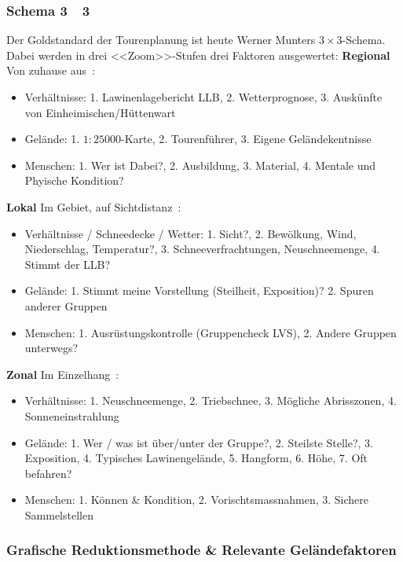 \subsubsection{Schema 3~\texttimes~3}
Der Goldstandard der Tourenplanung ist heute Werner Munters $3\times3$-Schema. Dabei werden in drei <<Zoom>>-Stufen drei Faktoren ausgewertet:
\textbf{Regional} 
Von zuhause aus~\cite{munter}:
\begin{itemize}
  \item Verhältnisse: 1. Lawinenlagebericht LLB, 2. Wetterprognose, 3. Auskünfte von Einheimischen/Hüttenwart
  \item Gelände: 1. $1:25000$-Karte, 2. Tourenführer, 3. Eigene Geländekentnisse
  \item Menschen: 1. Wer ist Dabei?, 2. Ausbildung, 3. Material, 4. Mentale und Phyische Kondition? 
\end{itemize}

\textbf{Lokal} Im Gebiet, auf Sichtdistanz~\cite{munter}\cite{redbull3x3}:
\begin{itemize}
  \item Verhältnisse / Schneedecke / Wetter: 1. Sicht?, 2. Bewölkung, Wind, Niederschlag, Temperatur?, 3. Schneeverfrachtungen, Neuschneemenge, 4. Stimmt der LLB?\
  \item Gelände: 1. Stimmt meine Vorstellung (Steilheit, Exposition)? 2. Spuren anderer Gruppen
  \item Menschen: 1. Ausrüstungskontrolle (Gruppencheck LVS), 2. Andere Gruppen unterwegs?
\end{itemize}
\textbf{Zonal} Im Einzelhang~\cite{munter}\cite{redbull3x3}:
\begin{itemize}
  \item Verhältnisse: 1. Neuschneemenge, 2. Triebschnee, 3. Mögliche Abrisszonen, 4. Sonneneinstrahlung
  \item Gelände: 1. Wer / was ist über/unter der Gruppe?, 2. Steilste Stelle?, 3. Exposition, 4. Typisches Lawinengelände, 5. Hangform, 6. Höhe, 7. Oft befahren?
  \item Menschen: 1. Können \& Kondition, 2. Vorischtsmassnahmen, 3. Sichere Sammelstellen
\end{itemize}

\subsubsection{Grafische Reduktionsmethode \& Relevante Geländefaktoren}

